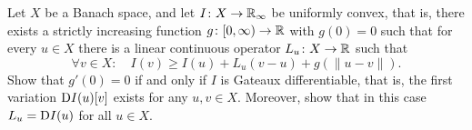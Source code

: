 \documentclass[12pt,a4paper]{article}
\begin{document}

\setcounter{AUFGABE}{14}


 

Let $X$ be a Banach space, and let $I\colon X\to{\mathbb R}_\infty$
be uniformly convex, that is,
there exists a strictly increasing function 
$g\colon[0,\infty)\to{\mathbb R}$
with $g(0)=0$
such that
for every $u\in X$ there is a linear continuous operator 
$L_u\colon X\to{\mathbb R}$
such that
\[
\forall v\in X: \quad I(v)\geq I(u)+L_u(v-u)+g(\|u-v\|). 
\] 
Show that $g'(0)=0$ if and only if 
$I$ is Gateaux differentiable,
that is, the first variation ${\mathrm D} I(u)[v]$ 
exists for any $u,v\in X$.
Moreover, show
that in this case $L_u={\mathrm D} I(u)$ for all $u\in X$.
\end{document}
